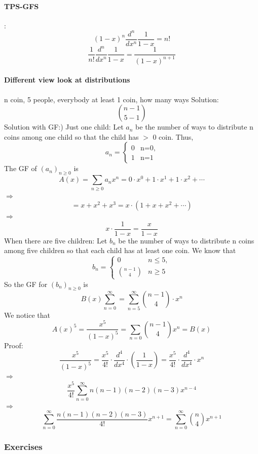 \documentclass{article}
\begin{document}
\paragraph{TPS-GFS}:\newline
$$(1-x)^n \frac{d^n}{dx^n}\frac{1}{1-x}=n!$$
$$\frac{1}{n!}\frac{d^n}{dx^n}\frac{1}{1-x}=\frac{1}{(1-x)^{n+1}}$$
\paragraph{Different view look at distributions}
n coin, 5 people, everybody at least 1 coin, how many ways \newline
Solution:\newline
$$\binom{n-1}{5-1}$$
Solution with GF:) Just one child:\newline
Let $a_n$ be the number of ways to distribute n coins among one
child so that the child has $>$ 0 coin.\newline
Thus,
$$a_n=\begin{cases}0&\text{n=0},\\1&\text{n=1}\end{cases}$$
The GF of $(a_n)_{n\ge 0}$ is 
$$A(x)=\sum_{n\ge 0}a_nx^n=0\cdot x^0+1\cdot x^1+1\cdot x^2+\cdots$$
$\Longrightarrow$
$$=x+x^2+x^3=x\cdot (1+x+x^2+\cdots)$$
$\Longrightarrow$
$$x\cdot \frac{1}{1-x}=\frac{x}{1-x}$$
When there are five children:
Let $b_n$ be the number of ways to distribute n coins among five children so that each child has at least one coin.\newline
We know that
$$b_n=\begin{cases}
0&\text{$n\leq 5$},\\{\binom{n-1}{4}}&\text{$n\ge 5$}\end{cases}$$
So the GF for $(b_n)_{n\ge 0}$ is 
$$B(x) \sum_{n=0}^{\infty}=\sum_{n=5}^{\infty}\binom{n-1}{4}\cdot x^n$$
We notice that
$$A(x)^5=\frac{x^5}{(1-x)^5}=\sum_{n=0}\binom{n-1}{4}x^n=B(x)$$
Proof:
$$\frac{x^5}{(1-x)^5}=\frac{x^5}{4!}\cdot \frac{d^4}{dx^4}\cdot (\frac{1}{1-x})=\frac{x^5}{4!}\cdot \frac{d^4}{dx^4}\cdot x^n$$
$\Longrightarrow$
$$\frac{x^5}{4!}\sum_{n=0}^{\infty}n(n-1)(n-2)(n-3)x^{n-4}$$
$\Longrightarrow$
$$\sum_{n=0}^{\infty}\frac{n(n-1)(n-2)(n-3)}{4!}x^{n+1}=\sum_{n=0}^{\infty}\binom{n}{4}x^{n+1}$$
\subsubsection{Exercises}
\end{document}
